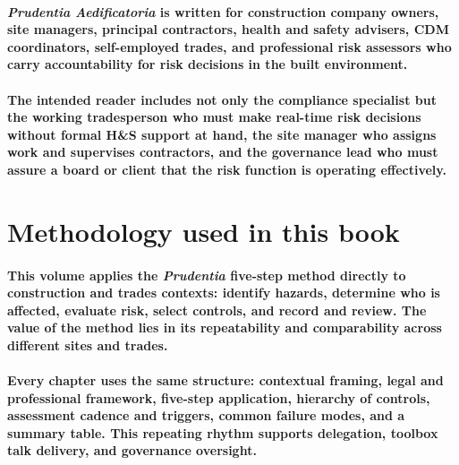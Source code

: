 \paragraph{\textit{Prudentia Aedificatoria} is written for construction company owners, site managers, principal contractors, health and safety advisers, CDM coordinators, self-employed trades, and professional risk assessors who carry accountability for risk decisions in the built environment.}

\paragraph{The intended reader includes not only the compliance specialist but the working tradesperson who must make real-time risk decisions without formal H\&S support at hand, the site manager who assigns work and supervises contractors, and the governance lead who must assure a board or client that the risk function is operating effectively.}

\section{Methodology used in this book}

\paragraph{This volume applies the \textit{Prudentia} five-step method directly to construction and trades contexts: identify hazards, determine who is affected, evaluate risk, select controls, and record and review. The value of the method lies in its repeatability and comparability across different sites and trades.}

\paragraph{Every chapter uses the same structure: contextual framing, legal and professional framework, five-step application, hierarchy of controls, assessment cadence and triggers, common failure modes, and a summary table. This repeating rhythm supports delegation, toolbox talk delivery, and governance oversight.}


